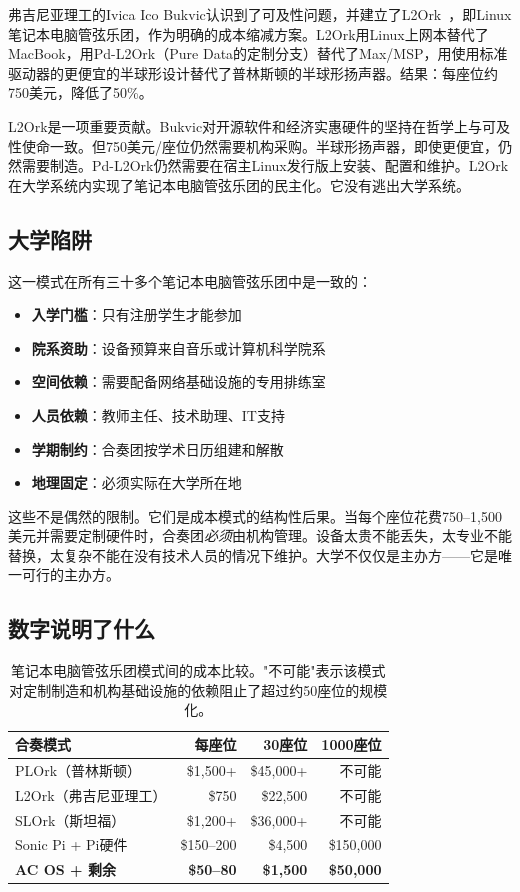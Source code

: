 \documentclass[10pt,letterpaper,twocolumn]{article}
\begin{document}
弗吉尼亚理工的Ivica Ico Bukvic认识到了可及性问题，并建立了L2Ork~\citep{bukvic2010l2ork}，即Linux笔记本电脑管弦乐团，作为明确的成本缩减方案。L2Ork用Linux上网本替代了MacBook，用Pd-L2Ork（Pure Data的定制分支）替代了Max/MSP，用使用标准驱动器的更便宜的半球形设计替代了普林斯顿的半球形扬声器。结果：每座位约750美元，降低了50\%。

L2Ork是一项重要贡献。Bukvic对开源软件和经济实惠硬件的坚持在哲学上与可及性使命一致。但750美元/座位仍然需要机构采购。半球形扬声器，即使更便宜，仍然需要制造。Pd-L2Ork仍然需要在宿主Linux发行版上安装、配置和维护。L2Ork在大学系统内实现了笔记本电脑管弦乐团的民主化。它没有逃出大学系统。

\subsection{大学陷阱}

这一模式在所有三十多个笔记本电脑管弦乐团中是一致的：

\begin{itemize}
  \item \textbf{入学门槛}：只有注册学生才能参加
  \item \textbf{院系资助}：设备预算来自音乐或计算机科学院系
  \item \textbf{空间依赖}：需要配备网络基础设施的专用排练室
  \item \textbf{人员依赖}：教师主任、技术助理、IT支持
  \item \textbf{学期制约}：合奏团按学术日历组建和解散
  \item \textbf{地理固定}：必须实际在大学所在地
\end{itemize}

这些不是偶然的限制。它们是成本模式的结构性后果。当每个座位花费750--1,500美元并需要定制硬件时，合奏团\emph{必须}由机构管理。设备太贵不能丢失，太专业不能替换，太复杂不能在没有技术人员的情况下维护。大学不仅仅是主办方——它是唯一可行的主办方。

\subsection{数字说明了什么}

\begin{table}[h]
\small
\centering
\begin{tabular}{lrrr}
\toprule
\textbf{合奏模式} & \textbf{每座位} & \textbf{30座位} & \textbf{1000座位} \\
\midrule
PLOrk（普林斯顿）       & \$1,500+ & \$45,000+ & 不可能 \\
L2Ork（弗吉尼亚理工）   & \$750      & \$22,500  & 不可能 \\
SLOrk（斯坦福）        & \$1,200+ & \$36,000+ & 不可能 \\
Sonic Pi + Pi硬件   & \$150--200 & \$4,500   & \$150,000 \\
\textbf{AC OS + 剩余} & \textbf{\$50--80} & \textbf{\$1,500} & \textbf{\$50,000} \\
\bottomrule
\end{tabular}
\caption{笔记本电脑管弦乐团模式间的成本比较。"不可能"表示该模式对定制制造和机构基础设施的依赖阻止了超过约50座位的规模化。}
\label{tab:cost}
\end{table}
\end{document}
